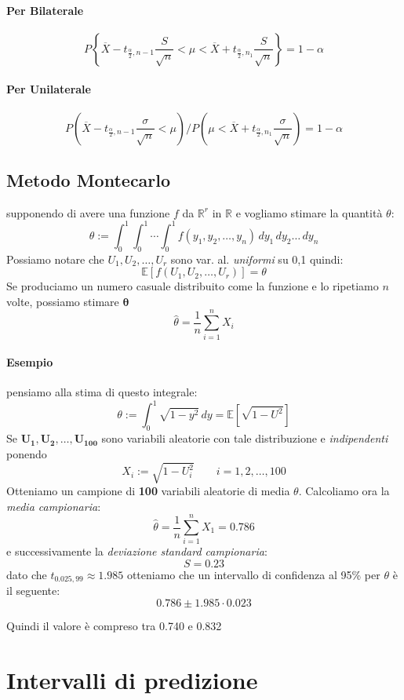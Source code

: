 \documentclass[]{article}
\newcommand{\ev}{\mathbb{E}[X]}
\renewcommand{\ev}[1]{\mathbb{E}[#1]}
\begin{document}
    \paragraph{Per Bilaterale}
    \[ P \left\{ \overline{X} - t_{\frac{\alpha}{2}, n-1} \frac{S}{\sqrt{n}} < \mu < \overline{X} + t_{\frac{\alpha}{2}, n_1} \frac{S}{\sqrt{n}} \right\} = 1 - \alpha \]
    \paragraph{Per Unilaterale}
    \[ P \left(  \overline{X} - t_{\frac{\alpha}{2}, n-1} \frac{\sigma}{\sqrt{n}} < \mu \right) / P \left( \mu < \overline{X} + t_{\frac{\alpha}{2}, n_1} \frac{\sigma}{\sqrt{n}}\right) = 1 - \alpha  \]
    \subsection{Metodo Montecarlo}
    supponendo di avere una funzione $f$ da $\mathbb{R}^r$ in $\mathbb{R}$ e vogliamo stimare la quantità $\theta$:
    \[ \theta := \int_{0}^{1} \int_{0}^{1} \cdots \int_{0}^{1} f(y_1, y_2, \ldots, y_n) \, dy_1 \, dy_2 \ldots \, dy_n \]
    Possiamo notare che $U_1, U_2, \ldots, U_r$ sono var. al. \textit{uniformi} su 0,1 quindi:
    \[ \ev{f(U_1, U_2, \ldots, U_r)} = \theta \]
    Se produciamo un numero casuale distribuito come la funzione e lo ripetiamo $n$ volte, possiamo stimare $\boldsymbol{\theta}$
    \[ \hat{\theta} = \frac{1}{n} \sum_{i = 1}^{n} X_i \]
    \paragraph{Esempio} pensiamo alla stima di questo integrale:
    \[ \theta := \int_{0}^{1} \sqrt{1 - y^2} \, dy = \ev{\sqrt{1-U^2}} \]
    Se $\boldsymbol{U_1, U_2, \ldots, U_{100}}$ sono variabili aleatorie con tale distribuzione e \textit{indipendenti} ponendo 
    \[ X_i := \sqrt{1-U^2_i} \qquad i = 1,2, \ldots, 100 \]
    Otteniamo un campione di \textbf{100} variabili aleatorie di media $\theta$. Calcoliamo ora la \textit{media campionaria}:
    \[ \hat{\theta} = \frac{1}{n} \sum_{i=1}^{n} X_1 = 0.786 \]
    e successivamente la \textit{deviazione standard campionaria}:
    \[ S = 0.23 \]
    dato che $t_{0.025, 99} \approx 1.985$ otteniamo che un intervallo di confidenza al 95\% per $\theta$ è il seguente:
    \[ 0.786 \pm 1.985 \cdot 0.023 \]
    \centerline{Quindi il valore è compreso tra 0.740 e 0.832}
    \section{Intervalli di predizione}
\end{document}
